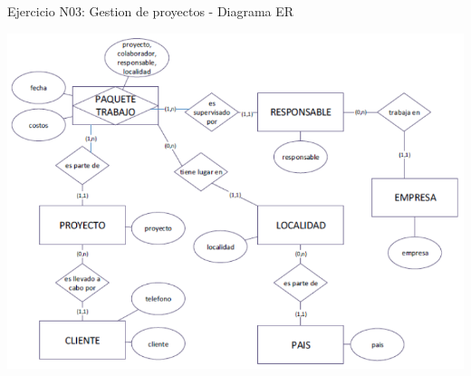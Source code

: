 \documentclass[12pt,letterpaper]{article}
\begin{document}
Ejercicio N03:  Gestion de proyectos - Diagrama ER

\begin{center}
\includegraphics[width=17cm]{IMG/er3.png} 
\end{center}
\end{document}
